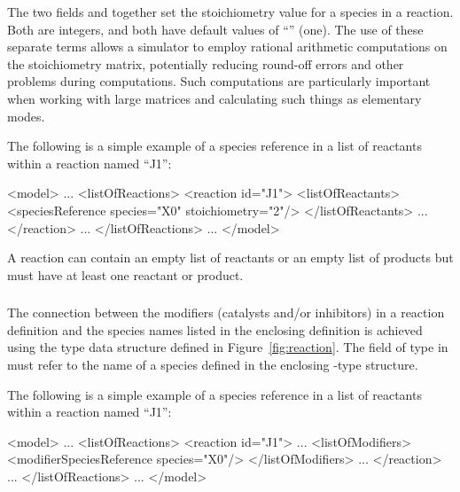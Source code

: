 \documentclass[10pt]{cekarticle}
\newcommand{\vref}[1]{\ref{#1}}
\begin{document}
The two fields  and 
together set the stoichiometry value for a species in a reaction.
Both are integers, and both have default values of
``'' (one).  The use of these separate terms allows
a simulator to employ rational arithmetic computations on the
stoichiometry matrix, potentially reducing round-off errors and
other problems during computations.  Such computations are
particularly important when working with large matrices and
calculating such things as elementary modes.

The following is a simple example of a species reference in a list
of reactants within a reaction named ``J1'':
\begin{example}
<model>
    ...
    <listOfReactions>
        <reaction id="J1">
            <listOfReactants>
                <speciesReference species="X0" stoichiometry="2"/>
            </listOfReactants>
            ...
        </reaction>
        ...
    </listOfReactions>
    ...
</model>
\end{example}

A reaction can contain an empty list of reactants or an empty list
of products but must have at least one reactant or product.

\subsubsection{}
\label{subsec:modifierreference}

The connection between the modifiers (catalysts and/or inhibitors)
in a reaction definition and the species names listed in the
enclosing  definition is achieved using the
 type data structure defined in
Figure~\vref{fig:reaction}. The field  of type
 in  must refer to the
name of a species defined in the enclosing -type
structure.

The following is a simple example of a species reference in a list
of reactants within a reaction named ``J1'':
\begin{example}
<model>
    ...
    <listOfReactions>
        <reaction id="J1">
            ...
            <listOfModifiers>
                <modifierSpeciesReference species="X0"/>
            </listOfModifiers>
            ...
        </reaction>
        ...
    </listOfReactions>
    ...
</model>
\end{example}
\end{document}
